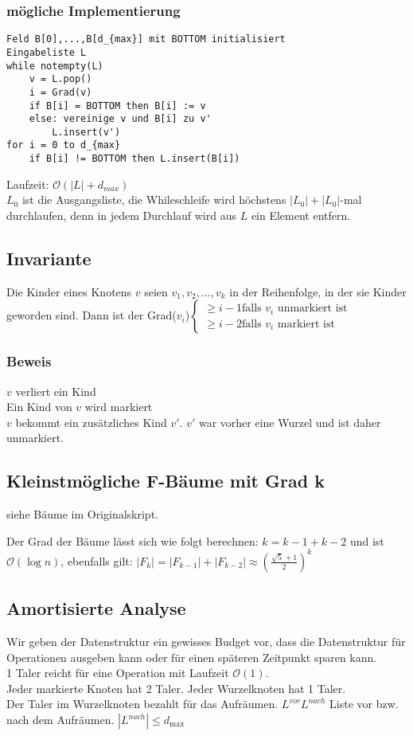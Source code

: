 \subsubsection{mögliche Implementierung}
\begin{lstlisting}[mathescape]
Feld B[0],...,B[d_{max}] mit BOTTOM initialisiert
Eingabeliste L
while notempty(L)
	v = L.pop()
	i = Grad(v)
	if B[i] = BOTTOM then B[i] := v
	else: vereinige v und B[i] zu v'
		L.insert(v')
for i = 0 to d_{max}
	if B[i] != BOTTOM then L.insert(B[i])
\end{lstlisting}
Laufzeit: $\mathcal{O}(|L|+d_{max})$\\
$L_0$ ist die Ausgangsliste, die Whileschleife wird höchstens $|L_0|+|L_0|$-mal durchlaufen, denn in jedem Durchlauf wird aus $L$ ein Element entfern.\\

\subsection{Invariante}
Die Kinder eines Knotens $v$ seien $v_1,v_2,...,v_k$ in der Reihenfolge, in der sie Kinder geworden sind. Dann ist der Grad($v_i$)$\begin{cases} \geq i-1 \text{falls $v_i$ unmarkiert ist} \\ \geq i-2 \text{falls $v_i$ markiert ist} \end{cases}$

\subsubsection{Beweis}
$v$ verliert ein Kind \checkmark\\
Ein Kind von $v$ wird markiert \checkmark\\
$v$ bekommt ein zusätzliches Kind $v'$. $v'$ war vorher eine Wurzel und ist daher unmarkiert. \checkmark\\

\subsection{Kleinstmögliche F-Bäume mit Grad k}
siehe Bäume im Originalskript.

Der Grad der Bäume lässt sich wie folgt berechnen: $k = k-1 + k-2$ und ist $\mathcal{O}(\log n)$, ebenfalls gilt: $|F_k| = |F_{k-1}| + |F_{k-2}| \approx (\frac{\sqrt{5}+1}{2})^k$

\subsection{Amortisierte Analyse}
Wir geben der Datenstruktur ein gewisses Budget vor, dass die Datenstruktur für Operationen ausgeben kann oder für einen späteren Zeitpunkt sparen kann.\\ 1 Taler reicht für eine Operation mit Laufzeit $\mathcal{O}(1)$.\\
Jeder markierte Knoten hat 2 Taler. Jeder Wurzelknoten hat 1 Taler.\\
Der Taler im Wurzelknoten bezahlt für das Aufräumen. $L^{vor} L^{nach}$ Liste vor bzw. nach dem Aufräumen. $|L^{nach}| \leq d_{\max}$\\
